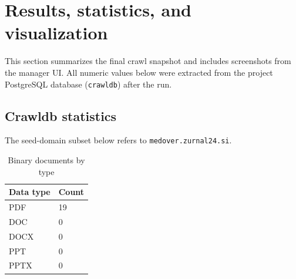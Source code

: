 \documentclass[9pt]{IEEEtran}
\begin{document}
\section{Results, statistics, and visualization}
This section summarizes the final crawl snapshot and includes screenshots from the manager UI.
All numeric values below were extracted from the project PostgreSQL database (\texttt{crawldb}) after the run.

\subsection{Crawldb statistics}
The seed-domain subset below refers to \texttt{medover.zurnal24.si}.

\begin{table}[H]
    \centering
    \caption{Main crawl statistics (seed domain and full crawldb)}
\end{table}

\begin{table}[H]
    \centering
    \caption{Binary documents by type}
    \begin{tabular}{@{}ll@{}}
        \toprule
        Data type & Count \\ \midrule
        PDF       & 19 \\
        DOC       & 0 \\
        DOCX      & 0 \\
        PPT       & 0 \\
        PPTX      & 0 \\ \bottomrule
    \end{tabular}
\end{table}
\end{document}

